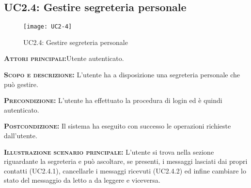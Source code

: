\subsection{UC2.4: Gestire segreteria personale}
\begin{figure}[H]
\begin{center}
\texttt{[image: UC2-4]}
\caption{UC2.4: Gestire segreteria personale}\label{fig:segreteria}
\end{center}
\end{figure}
\begin{description}
\item{\scshape\bfseries Attori principali:}Utente autenticato.
\item{\scshape\bfseries Scopo e descrizione:} L'utente ha a disposizione una segreteria personale che può gestire.
\item{\scshape\bfseries Precondizione:} L'utente ha effettuato la procedura di login ed è quindi autenticato.
\item{\scshape\bfseries Postcondizione:} Il sistema ha eseguito con successo le operazioni richieste dall'utente.
\item{\scshape\bfseries Illustrazione scenario principale:} L'utente si trova nella sezione riguardante la segreteria e può ascoltare, se presenti, i messaggi lasciati dai propri contatti (UC2.4.1), cancellarle i messaggi ricevuti (UC2.4.2) ed infine cambiare lo stato del messaggio da letto a da leggere e viceversa.
\end{description}

